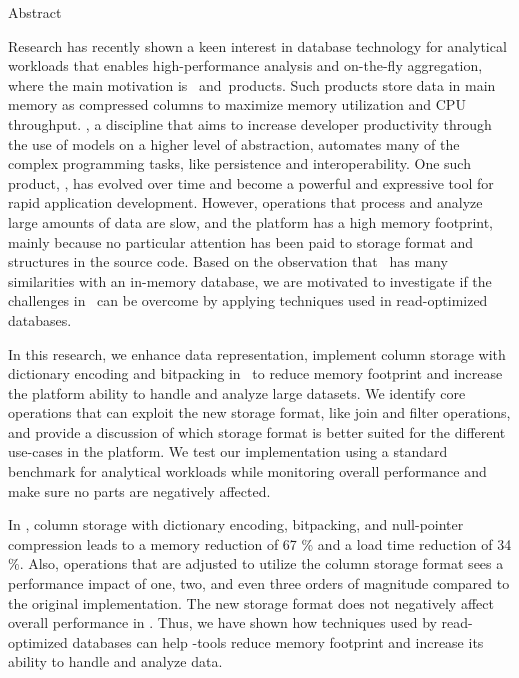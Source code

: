 {\Huge Abstract}
\vspace{1cm}

Research has recently shown a keen interest in database technology for analytical workloads that enables high-performance analysis and on-the-fly aggregation, where the main motivation is \bi~and\bd~products. Such products store data in main memory as compressed columns to maximize memory utilization and CPU throughput. \mde, a discipline that aims to increase developer productivity through the use of models on a higher level of abstraction, automates many of the complex programming tasks, like persistence and interoperability. One such product, \gap, has evolved over time and become a powerful and expressive tool for rapid application development. However, operations that process and analyze large amounts of data are slow, and the platform has a high memory footprint, mainly because no particular attention has been paid to storage format and structures in the source code. Based on the observation that \gap~has many similarities with an in-memory database, we are motivated to investigate if the challenges in \gap~can be overcome by applying techniques used in read-optimized databases. 

In this research, we enhance data representation, implement column storage with dictionary encoding and bitpacking in \gap~to reduce memory footprint and increase the platform ability to handle and analyze large datasets. We identify core operations that can exploit the new storage format, like join and filter operations, and provide a discussion of which storage format is better suited for the different use-cases in the platform. We test our implementation using a standard benchmark for analytical workloads while monitoring overall performance and make sure no parts are negatively affected. 

In \gap, column storage with dictionary encoding, bitpacking, and null-pointer compression leads to a memory reduction of 67 \% and a load time reduction of 34 \%. Also, operations that are adjusted to utilize the column storage format sees a performance impact of one, two, and even three orders of magnitude compared to the original implementation. The new storage format does not negatively affect overall performance in \gap. Thus, we have shown how techniques used by read-optimized databases can help \mde-tools reduce memory footprint and increase its ability to handle and analyze data. 



